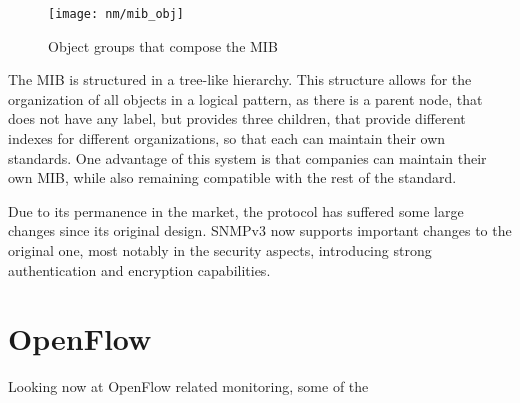 \begin{figure} [h]
    \texttt{[image: nm/mib\_obj]}
    \caption{Object groups that compose the MIB \cite{ CITE - RFC 1156}}
\end{figure}

\par The MIB is structured in a tree-like hierarchy. This structure allows for the organization of all objects in a logical pattern, as there is a parent node, that does not have any label, but provides three children, 
that provide different indexes for different organizations, so that each can maintain their own standards. One advantage of this system is that companies can maintain their own MIB, while also remaining compatible with the
rest of the standard. 

\par Due to its permanence in the market, the protocol has suffered some large changes since its original design. SNMPv3 now supports important changes to the original one, most notably in the security aspects, introducing strong
authentication and encryption capabilities.

\section {OpenFlow}

Looking now at OpenFlow related monitoring, some of the 






